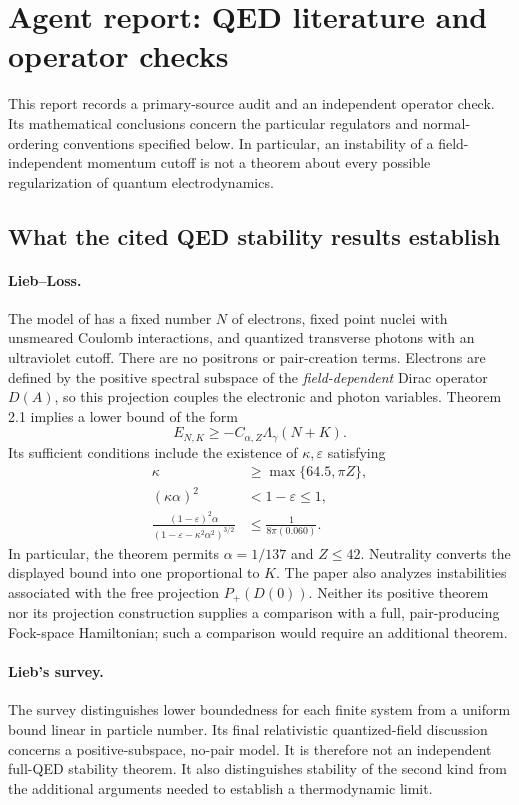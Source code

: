 \section{Agent report: QED literature and operator checks}
\label{app-qed:report}

This report records a primary-source audit and an independent operator check. Its mathematical conclusions concern the particular regulators and normal-ordering conventions specified below. In particular, an instability of a field-independent momentum cutoff is not a theorem about every possible regularization of quantum electrodynamics.

\subsection{What the cited QED stability results establish}
\label{app-qed:literature}

\paragraph{Lieb--Loss.}
The model of \cite{LL2002} has a fixed number \(N\) of electrons, fixed point nuclei with unsmeared Coulomb interactions, and quantized transverse photons with an ultraviolet cutoff. There are no positrons or pair-creation terms. Electrons are defined by the positive spectral subspace of the \emph{field-dependent} Dirac operator \(D(A)\), so this projection couples the electronic and photon variables. Theorem 2.1 implies a lower bound of the form
\[
 E_{N,K}\geq -C_{\alpha,Z}\Lambda_\gamma(N+K).
\]
Its sufficient conditions include the existence of \(\kappa,\varepsilon\) satisfying
\begin{align*}
 \kappa&\geq\max\{64.5,\pi Z\},\\
 (\kappa\alpha)^2&<1-\varepsilon\leq1,\\
 \frac{(1-\varepsilon)^2\alpha}
 {(1-\varepsilon-\kappa^2\alpha^2)^{3/2}}
 &\leq\frac{1}{8\pi(0.060)}.
\end{align*}
In particular, the theorem permits \(\alpha=1/137\) and \(Z\leq42\). Neutrality converts the displayed bound into one proportional to \(K\). The paper also analyzes instabilities associated with the free projection \(P_+(D(0))\). Neither its positive theorem nor its projection construction supplies a comparison with a full, pair-producing Fock-space Hamiltonian; such a comparison would require an additional theorem.

\paragraph{Lieb's survey.}
The survey \cite{Lieb2002} distinguishes lower boundedness for each finite system from a uniform bound linear in particle number. Its final relativistic quantized-field discussion concerns a positive-subspace, no-pair model. It is therefore not an independent full-QED stability theorem. It also distinguishes stability of the second kind from the additional arguments needed to establish a thermodynamic limit.

